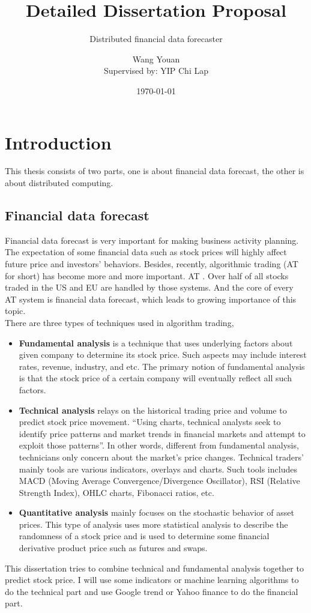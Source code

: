 \documentclass[12pt,a4paper]{scrartcl}
\title{Detailed Dissertation Proposal}
\subtitle{Distributed financial data forecaster}
\author{Wang Youan\\{\small Supervised by: YIP Chi Lap}}
\date{\today}
\begin{document}
	\maketitle
	\section{Introduction}
	This thesis consists of two parts, one is about financial data forecast, the other is about distributed computing.
	\subsection{Financial data forecast}
	Financial data forecast is very important for making business activity planning. The expectation of some financial data such as stock prices will highly affect future price\cite{Mastering_Financial_Calculations} and investors’ behaviors. Besides, recently, algorithmic trading (AT for short) has become more and more important. AT \cite{kissell2006algorithmic}. Over half of all stocks traded in the US and EU are handled by those systems\cite{nuti2011algorithmic}. And the core of every AT system is financial data forecast, which leads to growing importance of this topic.\\
	There are three types of techniques used in algorithm trading\cite{nuti2011algorithmic},
	\begin{itemize}
		\item \textbf{Fundamental analysis}\cite{lee2006encyclopedia} is a technique that uses underlying factors about given company to determine its stock price. Such aspects may include interest rates, revenue, industry, and etc. The primary notion of fundamental analysis is that the stock price of a certain company will eventually reflect all such factors.
		\item \textbf{Technical analysis}\cite{nuti2011algorithmic} relays on the historical trading price and volume to predict stock price movement. \enquote{Using charts, technical analysts seek to identify price patterns and market trends in financial markets and attempt to exploit those patterns}\cite{murphy1999technical}. In other words, different from fundamental analysis, technicians only concern about the market’s price changes. Technical traders’ mainly tools are various indicators, overlays and charts. Such tools includes MACD (Moving Average Convergence/Divergence Oscillator), RSI (Relative Strength Index), OHLC charts, Fibonacci ratios, etc.  
		\item \textbf{Quantitative analysis}\cite{nuti2011algorithmic} mainly focuses on the stochastic behavior of asset prices. This type of analysis uses more statistical analysis to describe the randomness of a stock price and is used to determine some financial derivative product price such as futures and swaps.
	\end{itemize}
	This dissertation tries to combine technical and fundamental analysis together to predict stock price. I will use some indicators or machine learning algorithms to do the technical part and use Google trend or Yahoo finance to do the financial part. 
\end{document}
